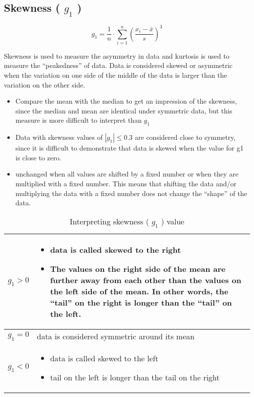 \subsection{Skewness ( $g_1$ ) \cite{ism-1}}\label{Skewness}
\[
    g_1 = \displaystyle\dfrac{1}{n} \cdot \sum_{i=1}^{n} \left( \dfrac{x_i - \bar{x}}{s} \right)^3
\]

Skewness is used to measure the asymmetry in data and kurtosis is used to measure the “peakedness” of data. Data is considered skewed or asymmetric when the variation on one side of the middle of the data is larger than the variation on the other side.

\begin{itemize}
    \item Compare the mean with the median to get an impression of the skewness, since the median and mean are identical under symmetric data, but this measure is more difficult to interpret than $g_1$
    \item Data with skewness values of $|g_1| \leq 0.3$ are considered close to symmetry, since it is difficult to demonstrate that data is skewed when the value for g1 is close to zero.
    \item unchanged when all values are shifted by a fixed number or when they are multiplied with a fixed number. This means that shifting the data and/or multiplying the data with a fixed number does not change the “shape” of the data.
\end{itemize}

\begin{table}
    \centering
    \begin{tabular}{|c|m{13cm}|}
        \hline
        $g_1 > 0$ & \vspace{0.5cm}\begin{itemize}
            \item data is called skewed to the right
            \item The values on the right side of the mean are further away from each other than the values on the left side of the mean. In other words, the “tail” on the right is longer than the “tail” on the left.
        \end{itemize}\vspace{-0.5cm} \\ \hline
        $g_1 = 0$ & data is considered symmetric around its mean \\ \hline
        $g_1 < 0$ & \vspace{0.5cm} \begin{itemize}
            \item data is called skewed to the left
            \item tail on the left is longer than the tail on the right
        \end{itemize} \vspace{-1cm} \\ \hline
    \end{tabular}
    \caption{Interpreting skewness ( $g_1$ ) value}
\end{table}

